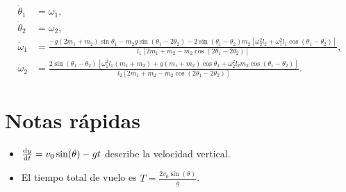 \documentclass[11pt,a4paper]{article}
\begin{document}
\begin{equation}
\begin{aligned}
\dot{\theta}_1 &= \omega_1, \\
\dot{\theta}_2 &= \omega_2, \\[0.5em]
\dot{\omega}_1 &=
\frac{
 -g (2m_1 + m_2)\sin\theta_1
 - m_2 g \sin(\theta_1 - 2\theta_2)
 - 2 \sin(\theta_1 - \theta_2) m_2
 \left[ \omega_2^2 l_2 + \omega_1^2 l_1 \cos(\theta_1 - \theta_2) \right]
}{
 l_1 \left[ 2m_1 + m_2 - m_2 \cos(2\theta_1 - 2\theta_2) \right]
}, \\[1em]
\dot{\omega}_2 &=
\frac{
 2 \sin(\theta_1 - \theta_2)
 \left[
  \omega_1^2 l_1 (m_1 + m_2)
  + g (m_1 + m_2)\cos\theta_1
  + \omega_2^2 l_2 m_2 \cos(\theta_1 - \theta_2)
 \right]
}{
 l_2 \left[ 2m_1 + m_2 - m_2 \cos(2\theta_1 - 2\theta_2) \right]
}.
\end{aligned}
\end{equation}





\section*{Notas rápidas}
\begin{itemize}
    \item $\dv{y}{t} = v_0 \sin(\theta) - g t$ describe la velocidad vertical.
    \item El tiempo total de vuelo es $T = \frac{2v_0\sin(\theta)}{g}$.
\end{itemize}
\end{document}
